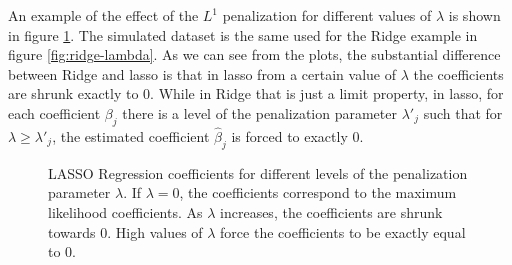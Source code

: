 \documentclass[a4paper, twoside, openright, 12pt]{report}
\theoremstyle{definition}
\theoremstyle{definition}
\theoremstyle{definition}
\theoremstyle{remark}
\begin{document}
An example of the effect of the \(L^1\) penalization for different values of \(\lambda\) is shown in figure \ref{fig:lasso-lambda}. The simulated dataset is the same used for the Ridge example in figure \ref{fig:ridge-lambda}. As we can see from the plots, the substantial difference between Ridge and \ac{lasso} is that in \ac{lasso} from a certain value of \(\lambda\) the coefficients are shrunk exactly to \(0\). While in Ridge that is just a limit property, in \ac{lasso}, for each coefficient \(\beta_j\) there is a level of the penalization parameter \(\lambda'_j\) such that for \(\lambda \ge \lambda'_j\), the estimated coefficient \(\hat{\beta}_j\) is forced to exactly \(0\).







\begin{figure}[!hbtp]

{\centering {}\newline{}\newline{}

}

\caption[LASSO Regression coefficients for different levels of the penalization parameter \(\lambda\).]{LASSO Regression coefficients for different levels of the penalization parameter \(\lambda\). If \(\lambda=0\), the coefficients correspond to the maximum likelihood coefficients. As \(\lambda\) increases, the coefficients are shrunk towards \(0\). High values of \(\lambda\) force the coefficients to be exactly equal to \(0\).}\label{fig:lasso-lambda}
\end{figure}
\end{document}
